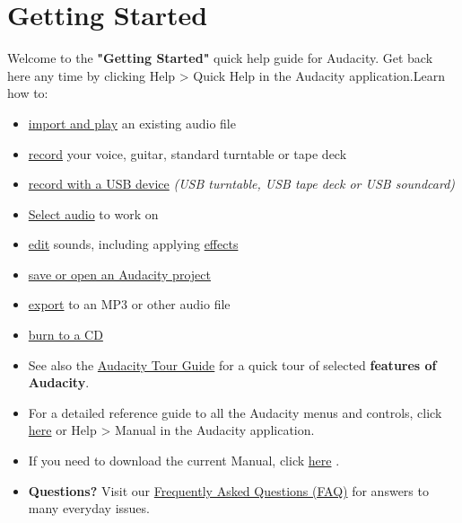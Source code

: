 \label{quickXhelpX}
\chapter{Getting Started}\begin{multicols}{2}Welcome to the \textbf{"Getting Started"} quick help guide for Audacity. Get back here any time by clicking Help > Quick Help in the Audacity application.Learn how to:

\begin{itemize}
\item 
\hyperref[\foo{manXplayX}]{ import and play}
 an existing audio file 
\item 
\hyperref[\foo{manXrecordX}]{ record}
 your voice, guitar, standard turntable or tape deck
\item 
\hyperref[\foo{manXusbXrecordingX}]{ record with a USB device}
\textit{(USB turntable, USB tape deck or USB soundcard)}
\item 
\hyperref[\foo{manXselectingXaudioXtheXbasicsX}]{Select audio}
 to work on
\item 
\hyperref[\foo{manXeditX}]{ edit}
 sounds, including applying 
\hyperref[\foo{manXeffectXmenuX}]{effects}

\item 
\hyperref[\foo{manXsavingX}]{ save or open an Audacity project}

\item 
\hyperref[\foo{manXexportX}]{ export}
 to an MP3 or other audio file
\item 
\hyperref[\foo{manXburncdX}]{ burn to a CD}

\end{itemize}

\begin{itemize}
\item  See also the 
\hyperref[\foo{manXaudacityXtourXguideX}]{Audacity Tour Guide}
 for a quick tour of selected \textbf{features of Audacity}. 
\item  For a detailed reference guide to all the Audacity menus and controls, click 
\hyperref[\foo{indexXreference}]{here}
 or Help > Manual in the Audacity application. 
\item  If you need to download the current Manual, click 
\hyperref[\foo{manXunzippingXtheXmanualX}]{here}
.
\item \textbf{Questions?} Visit our 
\hyperref[\foo{manXfaqX}]{Frequently Asked Questions (FAQ)}
 for answers to many everyday issues.  
\end{itemize}
\end{multicols}